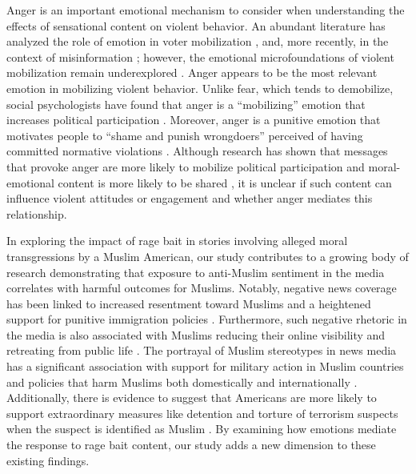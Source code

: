 Anger is an important emotional mechanism to consider when understanding the effects of sensational content on violent behavior. An abundant literature has analyzed the role of emotion in voter mobilization \citep{ansolabehere1997going,banks2014anger,brader2005striking,brader2006campaigning,freedman1999measuring,huber2015seeingred,marcus2000affective,mendelberg2001race}, and, more recently, in the context of misinformation \citep{vosoughi2018spread}; however, the emotional microfoundations of violent mobilization remain underexplored \citep{viterna2013women}. Anger appears to be the most relevant emotion in mobilizing violent behavior. Unlike fear, which tends to demobilize, social psychologists have found that anger is a ``mobilizing'' emotion that increases political participation \citep{ansolabehere1997going, banks2014anger, lerner2001fear,ryan2012click, valentino2002cues, valentino2011election}. Moreover, anger is a punitive emotion that motivates people to ``shame and punish wrongdoers'' perceived of having committed normative violations \citep{crockett2017moral, goldberg1999rage}. Although research has shown that messages that provoke anger are more likely to mobilize political participation \citep{ryan2012click,valentino2002cues, valentino2011election} and moral-emotional content is more likely to be shared \citep{brady2017emotion}, it is unclear if such content can influence violent attitudes or engagement and whether anger mediates this relationship. 

In exploring the impact of rage bait in stories involving alleged moral transgressions by a Muslim American, our study contributes to a growing body of research demonstrating that exposure to anti-Muslim sentiment in the media correlates with harmful outcomes for Muslims. Notably, negative news coverage has been linked to increased resentment toward Muslims and a heightened support for punitive immigration policies \citep{lajevardi2021media}. Furthermore, such negative rhetoric in the media is also associated with Muslims reducing their online visibility and retreating from public life \citep{hobbs2019effects}. The portrayal of Muslim stereotypes in news media has a significant association with support for military action in Muslim countries and policies that harm Muslims both domestically and internationally \citep{saleem2017exposure}. Additionally, there is evidence to suggest that Americans are more likely to support extraordinary measures like detention and torture of terrorism suspects when the suspect is identified as Muslim \citep{piazza2015terrorist}. By examining how emotions mediate the response to rage bait content, our study adds a new dimension to these existing findings.

